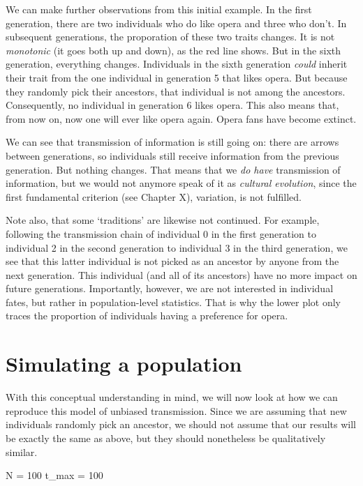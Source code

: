 \documentclass[
  a4paperpaper,
  ,captions=tableheading
]{scrbook}
\newenvironment{Shaded}{\begin{snugshade}}{\end{snugshade}}
\newcommand{\DecValTok}[1]{\textcolor[rgb]{0.68,0.00,0.00}{#1}}
\newcommand{\NormalTok}[1]{\textcolor[rgb]{0.00,0.23,0.31}{#1}}
\newcommand{\OperatorTok}[1]{\textcolor[rgb]{0.37,0.37,0.37}{#1}}
\begin{document}
We can make further observations from this initial example. In the first
generation, there are two individuals who do like opera and three who
don't. In subsequent generations, the proporation of these two traits
changes. It is not \emph{monotonic} (it goes both up and down), as the
red line shows. But in the sixth generation, everything changes.
Individuals in the sixth generation \emph{could} inherit their trait
from the one individual in generation 5 that likes opera. But because
they randomly pick their ancestors, that individual is not among the
ancestors. Consequently, no individual in generation 6 likes opera. This
also means that, from now on, now one will ever like opera again. Opera
fans have become extinct.

We can see that transmission of information is still going on: there are
arrows between generations, so individuals still receive information
from the previous generation. But nothing changes. That means that we
\emph{do have} transmission of information, but we would not anymore
speak of it as \emph{cultural evolution}, since the first fundamental
criterion (see Chapter X), variation, is not fulfilled.

Note also, that some `traditions' are likewise not continued. For
example, following the transmission chain of individual 0 in the first
generation to individual 2 in the second generation to individual 3 in
the third generation, we see that this latter individual is not picked
as an ancestor by anyone from the next generation. This individual (and
all of its ancestors) have no more impact on future generations.
Importantly, however, we are not interested in individual fates, but
rather in population-level statistics. That is why the lower plot only
traces the proportion of individuals having a preference for opera.

\hypertarget{simulating-a-population}{%
\section{Simulating a population}\label{simulating-a-population}}

With this conceptual understanding in mind, we will now look at how we
can reproduce this model of unbiased transmission. Since we are assuming
that new individuals randomly pick an ancestor, we should not assume
that our results will be exactly the same as above, but they should
nonetheless be qualitatively similar.

\begin{Shaded}
\begin{Highlighting}[]
\NormalTok{N }\OperatorTok{=} \DecValTok{100}
\NormalTok{t\_max }\OperatorTok{=} \DecValTok{100}
\end{Highlighting}
\end{Shaded}
\end{document}
